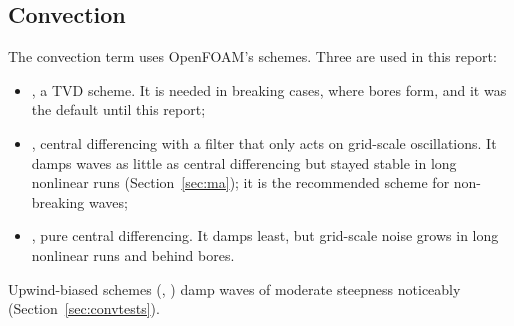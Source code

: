 \subsection{Convection}
\label{sec:convection}

The convection term uses OpenFOAM's schemes. Three are used in this report:
\begin{itemize}[nosep]
  \item {}, a TVD scheme. It is needed in breaking
        cases, where bores form, and it was the default until this report;
  \item {}, central differencing with a filter
        that only acts on grid-scale oscillations. It damps waves as little as
        central differencing but stayed stable in long nonlinear runs
        (Section~\ref{sec:ma}); it is the recommended scheme for non-breaking
        waves;
  \item {}, pure central differencing. It damps least, but
        grid-scale noise grows in long nonlinear runs and behind bores.
\end{itemize}
Upwind-biased schemes (, ) damp waves of moderate
steepness noticeably (Section~\ref{sec:convtests}).
